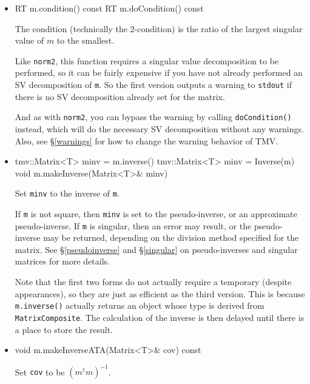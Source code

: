 \documentclass[twoside,letterpaper,11pt]{article}
\renewcommand{\tt}[1]{{\lstinline {#1}}}
\begin{document}
\begin{itemize}
\item
\begin{tmvcode}
RT m.condition() const
RT m.doCondition() const
\end{tmvcode}
The condition (technically the 2-condition) is 
the ratio of the largest singular value of $m$ to the smallest.

Like \tt{norm2}, this function requires a singular value decomposition to be performed,
so it can be fairly expensive if you have not
already performed an SV decomposition of \tt{m}.
So the first version
outputs a warning to \tt{stdout} if there is no SV decomposition already set for the matrix.

And as with \tt{norm2}, you can bypass the warning by calling \tt{doCondition()} instead,
which will do the necessary SV decomposition without any warnings.  
Also, see \S\ref{warnings} for how to change the warning behavior of TMV.

\item
\begin{tmvcode}
tmv::Matrix<T> minv = m.inverse()
tmv::Matrix<T> minv = Inverse(m)
void m.makeInverse(Matrix<T>& minv)
\end{tmvcode}
Set \tt{minv} to the inverse of \tt{m}.  

If \tt{m} is not square, then \tt{minv} is set to the pseudo-inverse, or an approximate
pseudo-inverse.  If \tt{m} is singular, then an error may result, or the pseudo-inverse
may be returned, depending on the division method specified for the matrix.  
See \S\ref{pseudoinverse} and \S\ref{singular} 
on pseudo-inverses and singular matrices for more details.

Note that the first two forms do not actually require a 
temporary (despite appearances), so they are just as efficient as the third version.
This is because \tt{m.inverse()} actually returns an object whose type is derived from
\tt{MatrixComposite}.  The calculation of the inverse is then delayed 
until there is a place to store the result.

\item
\begin{tmvcode}
void m.makeInverseATA(Matrix<T>& cov) const
\end{tmvcode}
Set \tt{cov} to be $(m^\dagger m)^{-1}$.


\end{itemize}
\end{document}
